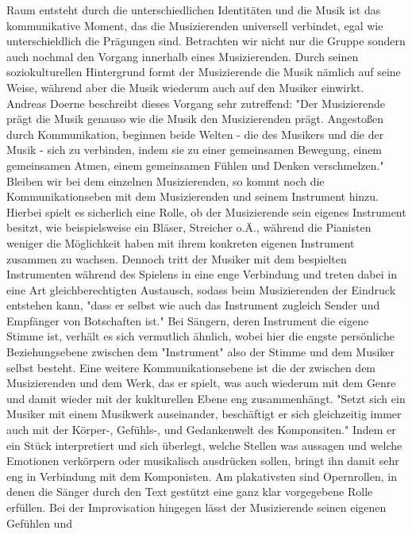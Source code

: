 Raum entsteht durch die unterschiedlichen Identitäten und die Musik ist das
kommunikative Moment, das die Musizierenden universell verbindet, egal wie
unterschieldlich die Prägungen sind. Betrachten wir nicht nur die Gruppe sondern
auch nochmal den Vorgang innerhalb eines Musizierenden. Durch seinen soziokulturellen Hintergrund
formt der Musizierende die Musik nämlich auf seine Weise, während aber die Musik
wiederum auch auf den Musiker einwirkt. Andreas Doerne beschreibt dieses Vorgang sehr
zutreffend:
"Der Musizierende prägt die Musik genauso wie die Musik den Musizierenden prägt.
Angestoßen durch Kommunikation, beginnen beide Welten - die des Musikers und die
der Musik - sich zu verbinden, indem sie zu einer gemeinsamen Bewegung, einem
gemeinsamen Atmen, einem gemeinsamen Fühlen und Denken verschmelzen." \autocite[60]{doerne:umfassend_musizieren}
Bleiben wir bei dem einzelnen Musizierenden, so kommt noch die
Kommunikationseben mit dem Musizierenden und seinem Instrument hinzu. Hierbei
spielt es sicherlich eine Rolle, ob der Musizierende sein eigenes Instrument
besitzt, wie beispielsweise ein Bläser, Streicher o.Ä., während die Pianisten
weniger die Möglichkeit haben mit ihrem konkreten eigenen Instrument zusammen zu
wachsen. Dennoch tritt der Musiker mit dem bespielten Instrumenten während des
Spielens in eine enge Verbindung und treten dabei in eine Art gleichberechtigten
Austausch, sodass beim Musizierenden der Eindruck entstehen kann, "dass er selbst wie auch das Instrument zugleich Sender und
Empfänger von Botschaften ist." \autocite[59]{doerne:umfassend_musizieren}
Bei Sängern, deren Instrument die eigene Stimme ist, verhält es sich vermutlich
ähnlich, wobei hier die engste persönliche Beziehungsebene zwischen dem
"Instrument" also der Stimme und dem Musiker selbst besteht. 
Eine weitere Kommunikationsebene ist die der zwischen dem Musizierenden und dem
Werk, das er spielt, was auch wiederum mit dem Genre und damit wieder mit der
kuklturellen Ebene eng zusammenhängt.
"Setzt sich ein Musiker mit einem Musikwerk auseinander, beschäftigt er sich
gleichzeitig immer auch mit der Körper-, Gefühls-, und Gedankenwelt des
Komponsiten." \autocite[59]{doerne:umfassend_musizieren} Indem er ein Stück
interpretiert und sich überlegt, welche Stellen was aussagen und welche
Emotionen verkörpern oder musikalisch ausdrücken sollen, bringt ihn damit sehr
eng in Verbindung mit dem Komponisten. Am plakativsten sind Opernrollen, in denen die
Sänger durch den Text gestützt eine ganz klar vorgegebene Rolle erfüllen. Bei
der Improvisation hingegen lässt der Musizierende seinen eigenen Gefühlen und
